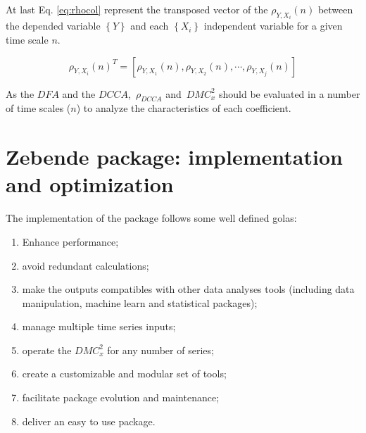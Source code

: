 \documentclass[article]{jss}
\begin{document}
At last Eq. \ref{eq:rhocol} represent the transposed vector of the $\rho_{Y,X_{i}}(n)$ between the depended variable $\left\lbrace Y \right\rbrace $ and each $\left\lbrace X_{i} \right\rbrace $ independent variable for a given time scale $n$.

\begin{equation} \label{eq:rhocol}
  \rho_{Y,X_i}(n)^T=[\rho_{Y,X_1}(n), \rho_{Y,X_2}(n),\cdots,\rho_{Y,X_j}(n)]
\end{equation}

As the $DFA$ and the $DCCA$,~$\rho_{DCCA}$ and~$DMC_x^2$ should be evaluated in a number of time scales ($n$) to analyze the characteristics of each coefficient.



\section{Zebende package: implementation and optimization} \label{sec:optimization}

The implementation of the  package follows some well defined golas:

\begin{enumerate}
  \item Enhance performance;
  \item avoid redundant calculations;
  \item make the outputs compatibles with other data analyses tools (including data manipulation, machine learn and statistical packages);
  \item manage multiple time series inputs;
  \item operate the $DMC_x^2$ for any number of series;
  \item create a customizable and modular set of tools;
  \item facilitate package evolution and maintenance;
  \item deliver an easy to use package.
\end{enumerate}
\end{document}
